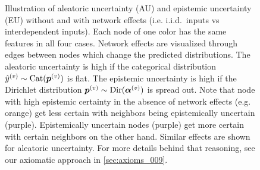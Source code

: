 \begin{figure}[!h]
	\caption{Illustration of aleatoric uncertainty (AU) and epistemic uncertainty (EU) without and with network effects (i.e. i.i.d.\ inputs vs interdependent inputs). Each node of one color has the same features in all four cases. Network effects are visualized through edges between nodes which change the predicted distributions. The aleatoric uncertainty is high if the categorical distribution $\hat{y} ^{(v)} \sim \operatorname{Cat}(\bm{p}^{(v)})$ is flat. The epistemic uncertainty is high if the Dirichlet distribution $\bm{p}^{(v)} \sim \operatorname{Dir}(\bm{\alpha}^{(v)})$ is spread out. Note that node with high epistemic certainty in the absence of network effects (e.g. orange) get less certain with neighbors being epistemically uncertain (purple). Epistemically uncertain nodes (purple) get more certain with certain neighbors on the other hand. Similar effects are shown for aleatoric uncertainty. For more details behind that reasoning, see our axiomatic approach in \cref{sec:axioms_009}.}
    \label{fig:uncertainty_types_large}
\end{figure}

\clearpage